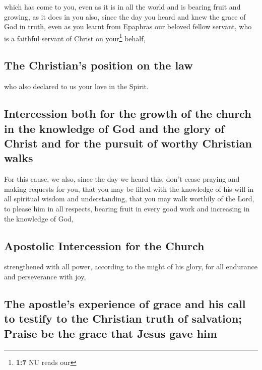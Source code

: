  which has come to you, even as it is in all the world and
is bearing fruit and growing, as it does in you also, since the day you
heard and knew the grace of God in truth,  even as you
learnt from Epaphras our beloved fellow servant, who is a faithful
servant of Christ on your\footnote{\textbf{1:7} NU reads our} behalf,

\hypertarget{the-christians-position-on-the-law}{%
\subsection{The Christian's position on the
law}\label{the-christians-position-on-the-law}}

 who also declared to us your love in the Spirit.

\hypertarget{intercession-both-for-the-growth-of-the-church-in-the-knowledge-of-god-and-the-glory-of-christ-and-for-the-pursuit-of-worthy-christian-walks}{%
\subsection{Intercession both for the growth of the church in the
knowledge of God and the glory of Christ and for the pursuit of worthy
Christian
walks}\label{intercession-both-for-the-growth-of-the-church-in-the-knowledge-of-god-and-the-glory-of-christ-and-for-the-pursuit-of-worthy-christian-walks}}

 For this cause, we also, since the day we heard this,
don't cease praying and making requests for you, that you may be filled
with the knowledge of his will in all spiritual wisdom and
understanding,  that you may walk worthily of the Lord,
to please him in all respects, bearing fruit in every good work and
increasing in the knowledge of God,

\hypertarget{apostolic-intercession-for-the-church}{%
\subsection{Apostolic Intercession for the
Church}\label{apostolic-intercession-for-the-church}}

 strengthened with all power, according to the might of
his glory, for all endurance and perseverance with joy,

\hypertarget{the-apostles-experience-of-grace-and-his-call-to-testify-to-the-christian-truth-of-salvation-praise-be-the-grace-that-jesus-gave-him}{%
\subsection{The apostle's experience of grace and his call to testify to
the Christian truth of salvation; Praise be the grace that Jesus gave
him}\label{the-apostles-experience-of-grace-and-his-call-to-testify-to-the-christian-truth-of-salvation-praise-be-the-grace-that-jesus-gave-him}}

